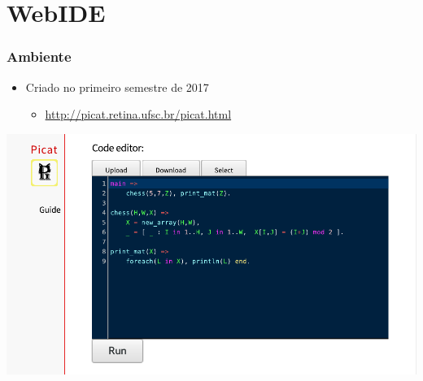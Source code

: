 \documentclass[brazil]{beamer}
\begin{document}
\section{WebIDE}

\begin{frame}

    \frametitle{Ambiente}

    \begin{itemize}
      \item Criado no primeiro semestre de 2017 \\
      \begin{itemize}
        \item \url{http://picat.retina.ufsc.br/picat.html}
      \end{itemize}

    \end{itemize}

\begin{center}
\includegraphics[width=.8\textwidth]{figures/ambiente.pdf}
\end{center}

\end{frame}
\end{document}
